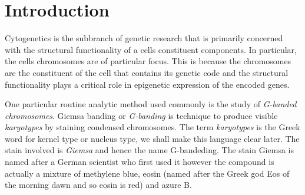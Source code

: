 
\section{Introduction}
\label{sec:introduction}

Cytogenetics is the subbranch of genetic research that is
primarily concerned with the structural functionality of
a cells constituent components. In particular, the cells
chromosomes are of particular focus. This is because the
chromosomes are the constituent of the cell that contains
its genetic code and the structural functionality plays
a critical role in epigenetic expression of the encoded
genes.

One particular routine analytic method used commonly
is the study of \emph{G-banded chromosomes}. Giemsa banding
or \emph{G-banding} is technique to produce visible 
\emph{karyotypes} by staining condensed chromosomes. The
term \emph{karyotypes} is the Greek word for kernel type or
nucleus type, we shall make this language clear later.
The stain involved is \emph{Giemsa} and hence the name
G-bandeding. The stain Giemsa is named after a German
scientist who first used it however the compound is actually
a mixture of methylene blue, eosin (named after the Greek
god Eos of the morning dawn and so eosin is red) and azure B. 
